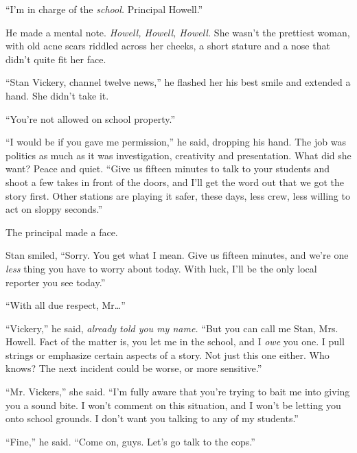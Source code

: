 ``I'm in charge of the \emph{school.  }Principal Howell.''



He made a mental note.  \emph{Howell, Howell, Howell.  }She wasn't the prettiest woman, with old acne scars riddled across her cheeks, a short stature and a nose that didn't quite fit her face.



``Stan Vickery, channel twelve news,'' he flashed her his best smile and extended a hand.  She didn't take it.



``You're not allowed on school property.''



``I would be if you gave me permission,'' he said, dropping his hand.  The job was politics as much as it was investigation, creativity and presentation.  What did she want?  Peace and quiet.  ``Give us fifteen minutes to talk to your students and shoot a few takes in front of the doors, and I'll get the word out that we got the story first.  Other stations are playing it safer, these days, less crew, less willing to act on sloppy seconds.''



The principal made a face.



Stan smiled, ``Sorry.  You get what I mean.  Give us fifteen minutes, and we're one \emph{less} thing you have to worry about today.  With luck, I'll be the only local reporter you see today.''



``With all due respect, Mr\ldots''



``Vickery,'' he said, \emph{already told you my name.}  ``But you can call me Stan, Mrs. Howell.  Fact of the matter is, you let me in the school, and I \emph{owe} you one.  I pull strings or emphasize certain aspects of a story.  Not just this one either.  Who knows?  The next incident could be worse, or more sensitive.''



``Mr. Vickers,'' she said.  ``I'm fully aware that you're trying to bait me into giving you a sound bite.  I won't comment on this situation, and I won't be letting you onto school grounds.  I don't want you talking to any\emph{ }of my students.''



``Fine,'' he said.  ``Come on, guys.  Let's go talk to the cops.''



